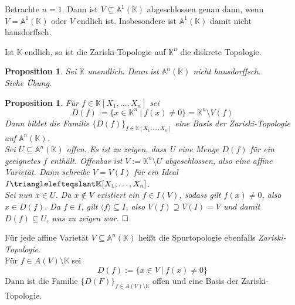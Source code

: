 \documentclass[11pt]{book}
\newtheorem{prop}[theorem]{Proposition}
\theoremstyle{nonumberbreak}
\newenvironment{pr}[1][]{\ifthenelse{\equal{#1}{}}{\proof}{\proof[#1]}\rm}{\endproof}
\newenvironment{ex}[1][]{\ifthenelse{\equal{#1}{}}{\example}{\example[#1]}\rm}{\endexample}
\newenvironment{definbem}[1][]{\ifthenelse{\equal{#1}{}}{\definibem}{\definibem[#1]}\rm}{\enddefinibem}
\begin{document}
\begin{spacing}{1.3}
\begin{ex}%
Betrachte $n=1$. Dann ist $V \subseteq \mathbb{A}^1(\mathbb{K})$ abgeschlossen genau dann, wenn $V= \mathbb{A}^1(\mathbb{K})$ oder $V$ endlich ist. Insbesondere ist $\mathbb{A}^1(\mathbb{K})$ damit nicht hausdorffsch.
\end{ex}

\begin{ex} %
Ist $\mathbb{K}$ endlich, so ist die Zariski-Topologie auf $\mathbb{K}^n$ die diskrete Topologie.
\end{ex}

\begin{prop} %
Sei $\mathbb{K}$ unendlich. Dann ist $\mathbb{A}^n(\mathbb{K})$ nicht hausdorffsch.\\
\begin{pr}
Siehe Übung.
\end{pr}
\end{prop}

\begin{prop} %
Für $f \in \mathbb{K}[X_1, \ldots, X_n]$ sei
$$D(f):=\{x \in \mathbb{K}^n \ \vert \ f(x) \neq 0 \} = \mathbb{K}^n \setminus V(f)$$
Dann bildet die Familie $\{D(f)\}_{f \in \mathbb{K}[X_1, \ldots, X_n]}$ eine Basis der Zariski-Topologie auf $\mathbb{A}^n(\mathbb{K})$.\\
\begin{pr}
Sei $U \subseteq \mathbb{A}^n(\mathbb{K})$ offen. Es ist zu zeigen, dass U eine Menge $D(f)$ für ein geeignetes $f$ enthält. Offenbar ist $V:=\mathbb{K}^n \setminus U$ abgeschlossen, also eine affine Varietät. Dann schreibe $V=V(I)$ für ein Ideal $I \trianglelefteqslant \mathbb{K}[X_1, \ldots, X_n]$.\\
Sei nun $x \in U$. Da $x\notin V$ existiert ein $f \in I(V)$, sodass gilt $f(x) \neq 0$, also $x \in D(f)$.
Da $f \in I$, gilt $\langle f\rangle \subseteq I$, also $V(f) \supseteq V(I)=V$ und damit $D(f) \subseteq U$, was zu zeigen war. $\hfill\Box$
\end{pr}
\end{prop}

\begin{definbem} %
Für jede affine Varietät $V \subseteq \mathbb{A}^n(\mathbb{K})$ heißt die Spurtopologie ebenfalls \textit{Zariski-Topologie}.\\
Für $f \in A(V)\setminus \mathbb{K}$ sei
$$D(f):=\{x \in V \ \vert \ f(x)\neq 0\}$$
Dann ist die Familie $\{D(F)\}_{f \in A(V)\setminus \mathbb{K}}$ offen und eine Basis der Zariski-Topologie.
\end{definbem}




\end{spacing}
\end{document}
